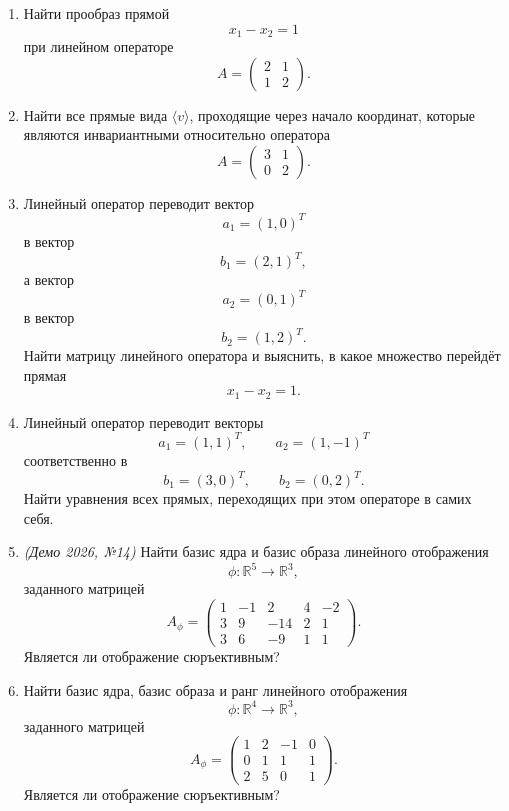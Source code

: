 \begin{enumerate}
    \item Найти прообраз прямой
    \[
    x_1 - x_2 = 1
    \]
    при линейном операторе
    \[
    A=
    \begin{pmatrix}
    2 & 1 \\
    1 & 2
    \end{pmatrix}.
    \]

    \item Найти все прямые вида $\langle v \rangle$, проходящие через начало координат, которые являются инвариантными относительно оператора
    \[
    A=
    \begin{pmatrix}
    3 & 1 \\
    0 & 2
    \end{pmatrix}.
    \]

    \item
    Линейный оператор переводит вектор
    \[
    a_1=(1,0)^T
    \]
    в вектор
    \[
    b_1=(2,1)^T,
    \]
    а вектор
    \[
    a_2=(0,1)^T
    \]
    в вектор
    \[
    b_2=(1,2)^T.
    \]
    Найти матрицу линейного оператора и выяснить, в какое множество перейдёт прямая
    \[
    x_1-x_2=1.
    \]

    \item
    Линейный оператор переводит векторы
    \[
    a_1=(1,1)^T,\qquad a_2=(1,-1)^T
    \]
    соответственно в
    \[
    b_1=(3,0)^T,\qquad b_2=(0,2)^T.
    \]
    Найти уравнения всех прямых, переходящих при этом операторе в самих себя.

    \item \textit{(Демо 2026, №14)}
    Найти базис ядра и базис образа линейного отображения
    \[
    \phi:\mathbb{R}^5\to\mathbb{R}^3,
    \]
    заданного матрицей
    \[
    A_\phi=
    \begin{pmatrix}
    1 & -1 & 2 & 4 & -2 \\
    3 & 9 & -14 & 2 & 1 \\
    3 & 6 & -9 & 1 & 1
    \end{pmatrix}.
    \]
    Является ли отображение сюръективным?

    \item
    Найти базис ядра, базис образа и ранг линейного отображения
    \[
    \phi:\mathbb{R}^4\to\mathbb{R}^3,
    \]
    заданного матрицей
    \[
    A_\phi=
    \begin{pmatrix}
    1 & 2 & -1 & 0 \\
    0 & 1 & 1 & 1 \\
    2 & 5 & 0 & 1
    \end{pmatrix}.
    \]
    Является ли отображение сюръективным?


\end{enumerate}
